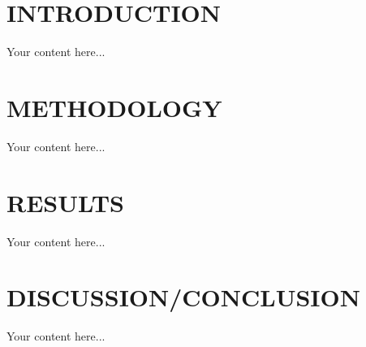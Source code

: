 \documentclass[12pt]{report}
\title{ADVANCED STATISTICS: FINAL PROJECT\vskip.4in TITLE OF THE DATASET\\TITLE OF YOUR PROJECT (OPTIONAL)}
\author{GROUP LEADER NAME (ROLL NUMBER)\\GROUP MEMBER 1 NAME (ROLL NUMBER)\\GROUP MEMBER 2 NAME (ROLL NUMBER)}
\begin{document}
\maketitle
\large

\section*{INTRODUCTION}
Your content here...
\newpage

\section*{METHODOLOGY}
Your content here...
\newpage

\section*{RESULTS}
Your content here...
\newpage

\section*{DISCUSSION/CONCLUSION}
Your content here...
\end{document}
